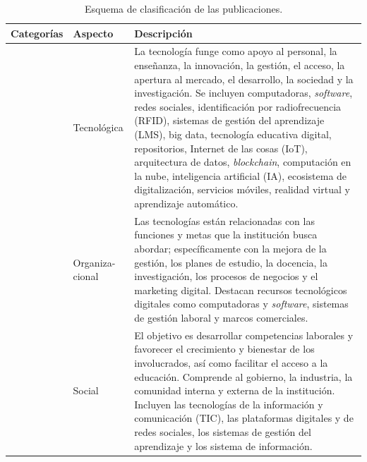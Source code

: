 \begin{longtable}{
>{\raggedright\arraybackslash}p{}
>{\raggedright\arraybackslash}p{} 
>{\raggedright\arraybackslash}p{}}
	\caption{Esquema de clasificación de las publicaciones.}
	\label{tab-05}\\
    \toprule
    Categorías & Aspecto & Descripción \\
    \midrule
    \endhead
    \multirow{3}{=}{Perspectiva temática
        (con base en \textcite{bikse2021} y \textcite{benavides2020-castro})} & Tecnológica & La tecnología funge como apoyo al
    personal, la enseñanza, la innovación, la gestión, el acceso, la
    apertura al mercado, el desarrollo, la sociedad y la investigación. Se
    incluyen computadoras, \emph{software}, redes sociales, identificación
    por radiofrecuencia (RFID), sistemas de gestión del aprendizaje (LMS),
    big data, tecnología educativa digital, repositorios, Internet de las
    cosas (IoT), arquitectura de datos, \emph{blockchain}, computación en la
    nube, inteligencia artificial (IA), ecosistema de digitalización,
    servicios móviles, realidad virtual y aprendizaje automático. \\
    & Organiza-cional & Las tecnologías están relacionadas con las funciones
    y metas que la institución busca abordar; específicamente con la mejora
    de la gestión, los planes de estudio, la docencia, la investigación, los
    procesos de negocios y el marketing digital. Destacan recursos
    tecnológicos digitales como computadoras y \emph{software}, sistemas de
    gestión laboral y marcos comerciales. \\
    & Social & El objetivo es desarrollar competencias laborales y favorecer
    el crecimiento y bienestar de los involucrados, así como facilitar el
    acceso a la educación. Comprende al gobierno, la industria, la comunidad
    interna y externa de la institución. Incluyen las tecnologías de la
    información y comunicación (TIC), las plataformas digitales y de redes
    sociales, los sistemas de gestión del aprendizaje y los sistema de
    información. \\
    

\end{longtable}
